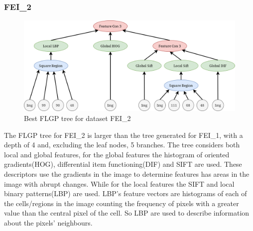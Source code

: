 \documentclass{article}
\begin{document}
\subsubsection*{FEI\_2}
\begin{figure}[h!]
	\centering
	\includegraphics[width=\linewidth]{flgp_F2.png}
	\caption{Best FLGP tree for dataset FEI\_2}
\end{figure}
\noindent The FLGP tree for FEI\_2 is larger than the tree generated for FEI\_1, with a depth of 4 and, excluding the leaf nodes, 5 branches. The tree considers both local and global features, for the global features the histogram of oriented gradients(HOG), differential item functioning(DIF) and SIFT are used. These descriptors use the gradients in the image to determine features has areas in the image with abrupt changes. While for the local features the SIFT and local binary patterns(LBP) are used. LBP's feature vectors are histograms of each of the cells/regions in the image counting the frequency of pixels with a greater value than the central pixel of the cell. So LBP are used to describe information about the pixels' neighbours.  \par
\end{document}
